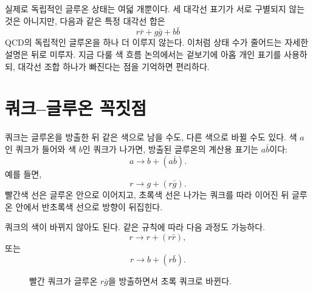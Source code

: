 \begin{classroomqa}
\end{classroomqa}

실제로 독립적인 글루온 상태는 여덟 개뿐이다. 세 대각선 표기가 서로 구별되지 않는 것은 아니지만, 다음과 같은 특정 대각선 합은
\begin{equation}
r\bar r+g\bar g+b\bar b
\end{equation}
QCD의 독립적인 글루온을 하나 더 이루지 않는다. 이처럼 상태 수가 줄어드는 자세한 설명은 뒤로 미루자. 지금 다룰 색 흐름 논의에서는 겉보기에 아홉 개인 표기를 사용하되, 대각선 조합 하나가 빠진다는 점을 기억하면 편리하다.

\section{쿼크--글루온 꼭짓점}

쿼크는 글루온을 방출한 뒤 같은 색으로 남을 수도, 다른 색으로 바뀔 수도 있다. 색 \(a\)인 쿼크가 들어와 색 \(b\)인 쿼크가 나가면, 방출된 글루온의 계산용 표기는 \(a\bar b\)이다:
\begin{equation}
a\longrightarrow b+(a\bar b).
\end{equation}
예를 들면,
\begin{equation}
r\longrightarrow g+(r\bar g).
\end{equation}
빨간색 선은 글루온 안으로 이어지고, 초록색 선은 나가는 쿼크를 따라 이어진 뒤 글루온 안에서 반초록색 선으로 방향이 뒤집힌다.

쿼크의 색이 바뀌지 않아도 된다. 같은 규칙에 따라 다음 과정도 가능하다.
\begin{equation}
r\longrightarrow r+(r\bar r),
\end{equation}
또는
\begin{equation}
r\longrightarrow b+(r\bar b).
\end{equation}

\begin{figure}[h]
\centering
{}
\caption{빨간 쿼크가 글루온 \(r\bar g\)을 방출하면서 초록 쿼크로 바뀐다.}
\end{figure}

